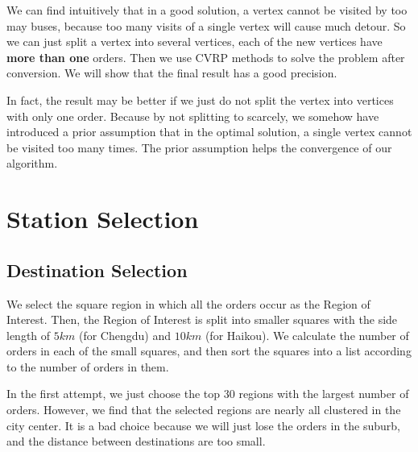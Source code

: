 \documentclass{llncs}
\begin{document}
We can find intuitively that in a good solution, a vertex cannot be visited by too may buses, because too many visits of a single vertex will cause much detour. So we can just split a vertex into several vertices, each of the new vertices have \textbf{more than one} orders. Then we use CVRP methods to solve the problem after conversion. We will show that the final result has a good precision.

In fact, the result may be better if we just do not split the vertex into vertices with only one order. Because by not splitting to scarcely, we somehow have introduced a prior assumption that in the optimal solution, a single vertex cannot be visited too many times. The prior assumption helps the convergence of our algorithm.


\section{Station Selection}
\subsection{Destination Selection}
We select the square region in which all the orders occur as the Region of Interest. Then, the Region of Interest is split into smaller squares with the side length of $5km$ (for Chengdu) and $10km$ (for Haikou). We calculate the number of orders in each of the small squares, and then sort the squares into a list according to the number of orders in them.

In the first attempt, we just choose the top 30 regions with the largest number of orders. However, we find that the selected regions are nearly all clustered in the city center. It is a bad choice because we will just lose the orders in the suburb, and the distance between destinations are too small.
\end{document}
